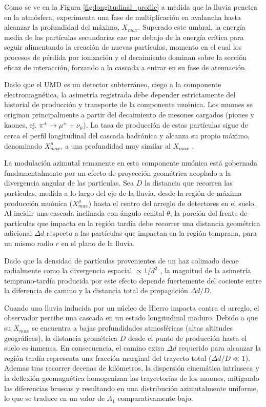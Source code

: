 Como se ve en la Figura \ref{fig:longitudinal_profile} a medida que la lluvia penetra en la atmósfera, experimenta una fase de multiplicación en avalancha hasta alcanzar la profundidad del máximo, $X_{max}$. Superado este umbral, la energía media de las partículas secundarias cae por debajo de la energía crítica para seguir alimentando la creación de nuevas partículas, momento en el cual los procesos de pérdida por ionización y el decaimiento dominan sobre la sección eficaz de interacción, forzando a la cascada a entrar en su fase de atenuación.

Dado que el UMD es un detector subterráneo, ciego a la componente electromagnética, la asimetría registrada debe depender estrictamente del historial de producción y transporte de la componente muónica. Los muones se originan principalmente a partir del decaimiento de mesones cargados (piones y kaones, ej. $\pi^{\pm} \rightarrow \mu^{\pm} + \nu_{\mu}$). La tasa de producción de estas partículas sigue de cerca el perfil longitudinal del cascada hadrónica y alcanza su propio máximo, denominado $X_{max}^{\mu}$, a una profundidad muy similar al $X_{max}$ \cite{Cazon2012}.

La modulación azimutal remanente en esta componente muónica está gobernada  fundamentalmente por un efecto de proyección geométrica acoplado a la divergencia angular de las partículas. Sea $D$ la distancia que recorren las partículas, medida a lo largo del eje de la lluvia, desde la región de máxima producción muónica ($X_{max}^{\mu}$) hasta el centro del arreglo de detectores en el suelo. Al incidir una cascada inclinada con ángulo cenital $\theta$, la porción del frente de partículas que impacta en la región tardía debe recorrer una distancia geométrica adicional $\Delta d$ respecto a las partículas que impactan en la región temprana, para un mismo radio $r$ en el plano de la lluvia.

Dado que la densidad de partículas provenientes de un haz colimado decae radialmente como la divergencia espacial  $\propto 1/d^2$ \cite{Cazon2012}, la magnitud de la asimetría temprano-tardía producida por este efecto depende fuertemente del cociente entre la diferencia de camino y la distancia total de propagación $\Delta d / D$.

Cuando una lluvia inducida por un núcleo de Hierro impacta contra el arreglo, el observador percibe una cascada en un estado longitudinal maduro. Debido a que su $X_{max}$ se encuentra a bajas profundidades atmosféricas (altas altitudes geográficas), la distancia geométrica $D$ desde el punto de producción hasta el suelo es inmensa. En consecuencia, el camino extra $\Delta d$ requerido para alcanzar la región tardía representa una fracción marginal del trayecto total ($\Delta d / D \ll 1$). Ademas tras recorrer decenas de kilómetros, la dispersión cinemática intrínseca y la deflexión geomagnética homogenizan las trayectorias de los muones, mitigando las diferencias bruscas y resultando en una distribución azimutalmente uniforme, lo que se traduce en un valor de $A_1$ comparativamente bajo.

